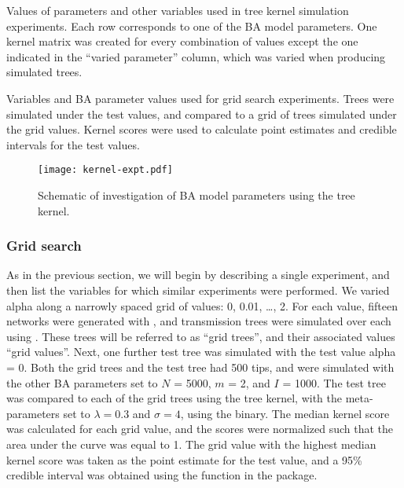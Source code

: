 \begin{landscape}
\begin{table}[ht]
  \centering
  
  \caption[Variables used in tree kernel simulation experiments]
  {
    Values of parameters and other variables used in tree kernel simulation
    experiments. Each row corresponds to one of the \gls{BA} model parameters.
    One kernel matrix was created for every combination of values except the
    one indicated in the ``varied parameter'' column, which was varied when
    producing simulated trees.
  }
  \label{tab:kernelexpt}
\end{table}

\begin{table}[ht]
  \centering
  
  \caption[Variables used in grid search experiments]
  {
    Variables and \gls{BA} parameter values used for grid search experiments. 
    Trees were simulated under the test values, and compared to a grid of trees
    simulated under the grid values. Kernel scores were used to calculate point
    estimates and credible intervals for the test values.
  }
  \label{tab:gridexpt}
\end{table}
\end{landscape}

\begin{figure}[ht]
  \centering
  \texttt{[image: kernel-expt.pdf]}
  \caption[Schematic of kernel classifier experiment]{
    Schematic of investigation of \gls{BA} model parameters using the tree
    kernel.
  }
  \label{fig:kernelexpt}
\end{figure}

\subsubsection*{Grid search}

As in the previous section, we will begin by describing a single experiment,
and then list the variables for which similar experiments were performed. We
varied \gls{alpha} along a narrowly spaced grid of values: 0, 0.01, \ldots, 2.
For each value, fifteen networks were generated with , and
transmission trees were simulated over each using . These
trees will be referred to as ``grid trees'', and their associated values ``grid
values''. Next, one further test tree was simulated with the test value
\gls{alpha} = 0. Both the grid trees and the test tree had 500 tips, and were
simulated with the other \gls{BA} parameters set to $N$ = 5000, $m$ = 2, and
$I$ = 1000. The test tree was compared to each of the grid trees using the tree
kernel, with the meta-parameters set to $\lambda = 0.3$ and $\sigma = 4$, using
the  binary. The median kernel score was calculated for
each grid value, and the scores were normalized such that the area under the
curve was equal to 1. The grid value with the highest median kernel score was
taken as the point estimate for the test value, and a 95\% credible interval
was obtained using the  function in the 
package.

